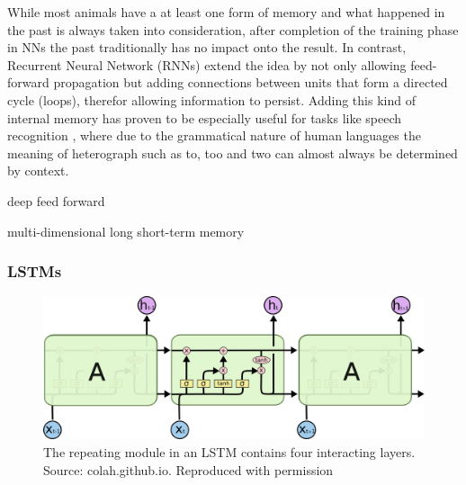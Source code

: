 While most animals have a at least one form of memory and what happened in the past is always taken into consideration, after completion of the training phase in NNs the past traditionally has no impact onto the result. 
In contrast, Recurrent Neural Network (RNNs) extend the idea by not only allowing feed-forward propagation but adding connections between units that form a directed cycle (loops), therefor allowing information to persist. 
Adding this kind of internal memory has proven to be especially useful for tasks like speech recognition \cite{sak2014long}, where due to the grammatical nature of human languages the meaning of heterograph such as to, too and two can almost always be determined by context.




deep feed forward

multi-dimensional long short-term memory 






\subsubsection{LSTMs}

\begin{figure}[h]
    \centering
	\includegraphics[width=.8\textwidth]{./images/illustrations/LSTM3}
    \caption{The repeating module in an LSTM contains four interacting layers. Source: colah.github.io. Reproduced with permission}
    \label{fig:mesh1}
\end{figure}



